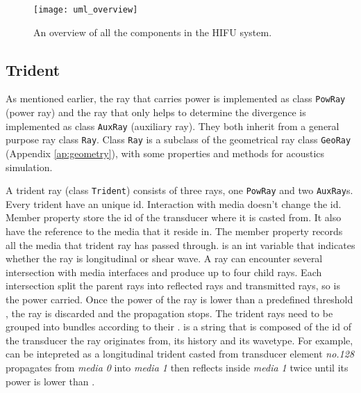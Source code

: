 \begin{figure}[h]
    \centering
    \texttt{[image: uml\_overview]}
    \caption{An overview of all the components in the HIFU system.}
    \label{fig:uml_overview}
\end{figure}

\subsection{Trident}
As mentioned earlier, the ray that carries power is implemented as class \texttt{PowRay} (power ray) and the ray that only helps to determine the divergence is implemented as class \texttt{AuxRay} (auxiliary ray). They both inherit from a general purpose ray class \texttt{Ray}. Class \texttt{Ray} is a subclass of the geometrical ray class \texttt{GeoRay} (Appendix \ref{ap:geometry}), with some properties and methods for acoustics simulation.

A trident ray (class \texttt{Trident}) consists of three rays, one \texttt{PowRay} and two \texttt{AuxRay}s. Every trident have an unique id. Interaction with media doesn't change the id. Member property  store the id of the transducer where it is casted from. It also have the reference to the media that it reside in. The member property  records all the media that trident ray has passed through.  is an int variable that indicates whether the ray is longitudinal or shear wave. A ray can encounter several intersection with media interfaces and produce up to four child rays. Each intersection split the parent rays into reflected rays and transmitted rays, so is the power carried. Once the power of the ray is lower than a predefined threshold , the ray is discarded and the propagation stops.
The trident rays need to be grouped into bundles according to their .  is a string that is composed of the id of the transducer the ray originates from, its history and its wavetype. For example,  can be intepreted as a longitudinal trident casted from transducer element \textit{no.128} propagates from \textit{media 0} into \textit{media 1} then reflects inside  \textit{media 1} twice until its power is lower than .



